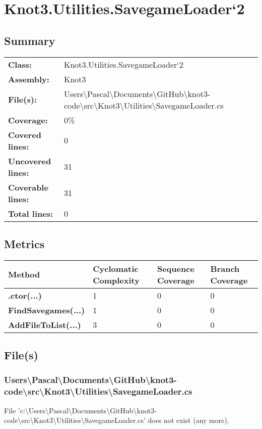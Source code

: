 \documentclass[a4paper,10pt]{article}
\begin{document}
\section{Knot3.Utilities.SavegameLoader`2}
\subsection{Summary}
\begin{longtable}[l]{ll}
\textbf{Class:} & Knot3.Utilities.SavegameLoader`2\\
\textbf{Assembly:} & Knot3\\
\textbf{File(s):} & \begin{minipage}[t]{12cm}{Users\textbackslash Pascal\textbackslash Documents\textbackslash GitHub\textbackslash knot3-code\textbackslash src\textbackslash Knot3\textbackslash Utilities\textbackslash SavegameLoader.cs}\end{minipage} \\
\textbf{Coverage:} & 0\%\\
\textbf{Covered lines:} & 0\\
\textbf{Uncovered lines:} & 31\\
\textbf{Coverable lines:} & 31\\
\textbf{Total lines:} & 0\\
\end{longtable}
\subsection{Metrics}
\begin{longtable}[l]{|l|l|l|l|}
\hline
\textbf{Method} & \textbf{Cyclomatic Complexity} & \textbf{Sequence Coverage} & \textbf{Branch Coverage}\\
\hline
\textbf{.ctor(...)} & 1 & 0 & 0\\
\hline
\textbf{FindSavegames(...)} & 1 & 0 & 0\\
\hline
\textbf{AddFileToList(...)} & 3 & 0 & 0\\
\hline
\end{longtable}
\subsection{File(s)}
\subsubsection{Users\textbackslash Pascal\textbackslash Documents\textbackslash GitHub\textbackslash knot3-code\textbackslash src\textbackslash Knot3\textbackslash Utilities\textbackslash SavegameLoader.cs}
 File 'c:\textbackslash Users\textbackslash Pascal\textbackslash Documents\textbackslash GitHub\textbackslash knot3-code\textbackslash src\textbackslash Knot3\textbackslash Utilities\textbackslash SavegameLoader.cs' does not exist (any more).
\newpage
\end{document}
